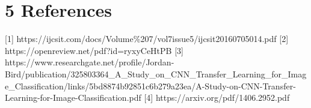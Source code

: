\documentclass[12pt]{article}
\begin{document}
\section*{\large{5 \hspace{10pt} References}}
[1] https://ijcsit.com/docs/Volume\%207/vol7issue5/ijcsit20160705014.pdf
[2] https://openreview.net/pdf?id=ryxyCeHtPB
[3] https://www.researchgate.net/profile/Jordan-Bird/publication/325803364\_A\_Study\_on\_CNN\_Transfer\_Learning\_for\_Image\_Classification/links/5bd8874b92851c6b279a23ea/A-Study-on-CNN-Transfer-Learning-for-Image-Classification.pdf
[4] https://arxiv.org/pdf/1406.2952.pdf
\end{document}
